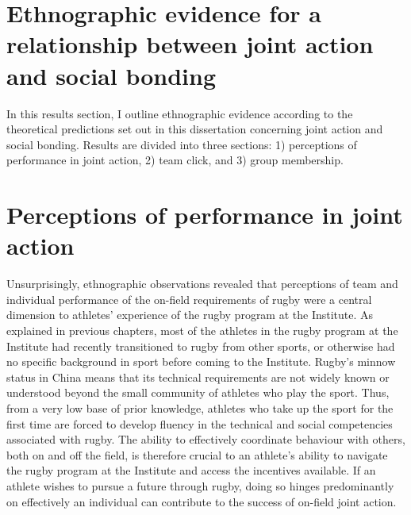                                       \begin{CJK}{UTF8}{gbsn}

\section{Ethnographic evidence for a relationship between joint action and social bonding}


In this results section, I outline ethnographic evidence according to the theoretical predictions set out in this dissertation concerning joint action and social bonding. Results are divided into three sections: 1) perceptions of performance in joint action, 2) team click, and 3) group membership.









\section{Perceptions of performance in joint action}
Unsurprisingly, ethnographic observations revealed that perceptions of team and individual performance of the on-field requirements of rugby were a central dimension to athletes' experience of the rugby program at the Institute.  As explained in previous chapters, most of the athletes in the rugby program at the Institute had recently transitioned to rugby from other sports, or otherwise had no specific background in sport before coming to the Institute.  Rugby's minnow status in China means that its technical requirements are not widely known or understood beyond the small community of athletes who play the sport.  Thus, from a very low base of prior knowledge, athletes who take up the sport for the first time are forced to develop fluency in the technical and social competencies associated with rugby.  The ability to effectively coordinate behaviour with others, both on and off the field, is therefore crucial to an athlete's ability to navigate the rugby program at the Institute and access the incentives available.  If an athlete wishes to pursue a future through rugby, doing so hinges predominantly on effectively an individual can contribute to the success of on-field joint action.


\end{CJK}
